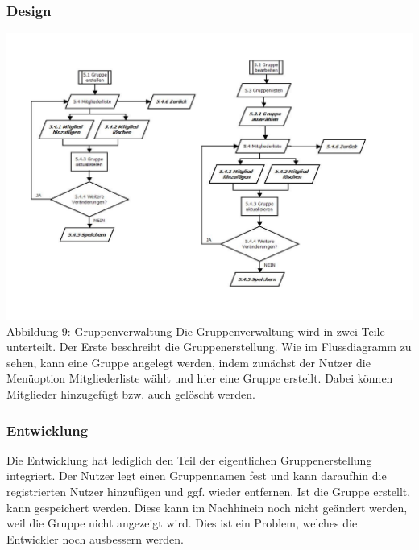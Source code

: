 \documentclass[12pt,a4paper]{article}
\begin{document}
\subsubsection*{Design}
\hspace*{-10mm} 
\includegraphics[trim=10mm 20mm 0mm 20mm,clip, scale=0.7]{Gruppenverwaltung.pdf}
\\
\footnotesize Abbildung 9: Gruppenverwaltung
\normalsize
\newline
\newline
Die Gruppenverwaltung wird in zwei Teile unterteilt. Der Erste beschreibt die Gruppenerstellung. Wie im Flussdiagramm zu sehen, kann eine Gruppe angelegt werden, indem zunächst der Nutzer die Menüoption Mitgliederliste wählt und hier eine Gruppe erstellt. Dabei können Mitglieder hinzugefügt bzw. auch gelöscht werden.
\subsubsection*{Entwicklung}
Die Entwicklung hat lediglich den Teil der eigentlichen Gruppenerstellung integriert. Der Nutzer legt einen Gruppennamen fest und kann daraufhin die registrierten Nutzer hinzufügen und ggf. wieder entfernen. Ist die Gruppe erstellt, kann gespeichert werden.
Diese kann im Nachhinein noch nicht geändert werden, weil die Gruppe nicht angezeigt wird. Dies ist ein Problem, welches die Entwickler noch ausbessern werden.
\end{document}

